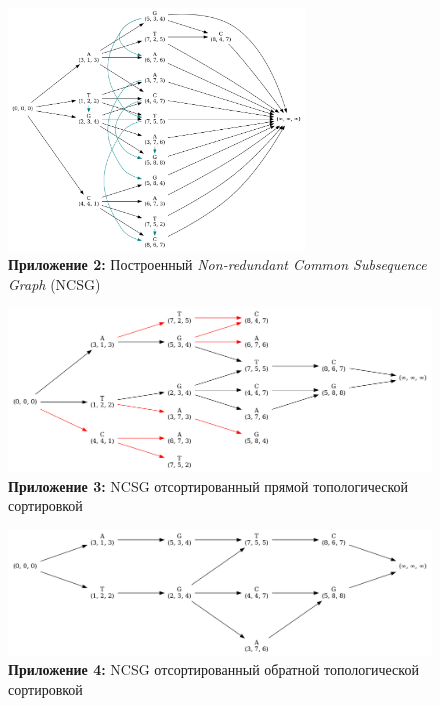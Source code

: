 \documentclass[a4paper,12pt]{extarticle}
\begin{document}
\clearpage
\begin{figure}[h!]
  \vspace{-1cm}
  \centering
  \caption*{\textbf{Приложение 2: }Построенный \textit{Non-redundant Common Subsequence Graph} (NCSG)}
  \includegraphics[width=0.7\textwidth]{Graph_1.png}
\end{figure}

\begin{figure}[h!]
  \centering
  \caption*{\textbf{Приложение 3: }NCSG отсортированный прямой топологической сортировкой}
  \includegraphics[width=1\textwidth]{Graph_2.png}
\end{figure}

\begin{figure}[h!]
  \caption*{\textbf{Приложение 4: }NCSG отсортированный обратной топологической сортировкой}
  \includegraphics[width=1\textwidth]{Graph_3.png}
  \vspace{-3cm}
\end{figure}
\clearpage
\end{document}
